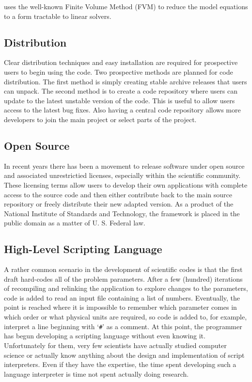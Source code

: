 \FiPy{} uses the well-known Finite Volume Method (FVM) to reduce the
model equations to a form tractable to linear solvers.

\subsection{Distribution}

Clear distribution techniques and easy installation are required for
prospective users to begin using the code. Two prospective methods are
planned for code distribution. The first method is simply creating
stable archive releases that users can unpack. The second method is to
create a code repository where users can update to the latest unstable
version of the code. This is useful to allow users access to the
latest bug fixes. Also having a central code repository allows more
developers to join the main project or select parts of the project.

\subsection{Open Source}

In recent years there has been a movement to release software under
open source and associated unrestrictied licenses, especially within
the scientific community.  These licensing terms allow users to
develop their own applications with complete access to the source code
and then either contribute back to the main source repository or
freely distribute their new adapted version.  As a product of the
National Institute of Standards and Technology, the \FiPy{} framework
is placed in the public domain as a matter of U. S. Federal law.

\subsection{High-Level Scripting Language}

A rather common scenario in the development of scientific codes is
that the first draft hard-codes all of the problem parameters.  After
a few (hundred) iterations of recompiling and relinking the
application to explore changes to the parameters, code is added to
read an input file containing a list of numbers.  Eventually, the
point is reached where it is impossible to remember which parameter
comes in which order or what physical units are required, so code is
added to, for example, interpret a line beginning with `\verb|#|' as a
comment.  At this point, the programmer has begun developing a
scripting language without even knowing it.  Unfortunately for them,
very few scientists have actually studied computer science or actually
know anything about the design and implementation of script
interpreters.  Even if they have the expertise, the time spent
developing such a language interpreter is time not spent actually
doing research.


